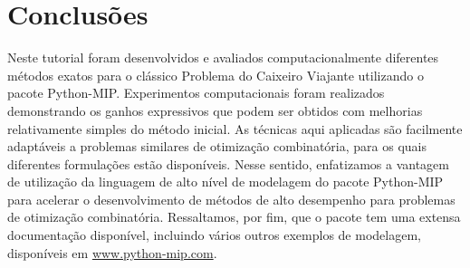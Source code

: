 \documentclass[a4paper,11pt,fleqn]{article}
\begin{document}
\section{Conclusões}

Neste tutorial foram desenvolvidos e avaliados computacionalmente diferentes métodos exatos para o clássico Problema do Caixeiro Viajante utilizando o pacote Python-MIP. 
Experimentos computacionais foram realizados demonstrando os ganhos expressivos que podem ser obtidos com melhorias relativamente simples do método inicial.
As técnicas aqui aplicadas são facilmente adaptáveis a problemas similares de otimização combinatória, para os quais diferentes formulações estão disponíveis. 
Nesse sentido, enfatizamos a vantagem de utilização da linguagem de alto nível de modelagem do pacote Python-MIP para acelerar o desenvolvimento de métodos de alto desempenho para problemas de otimização combinatória. 
Ressaltamos, por fim, que o pacote tem uma extensa documentação disponível, incluindo vários outros exemplos de modelagem, disponíveis em \url{www.python-mip.com}.



\end{document}
